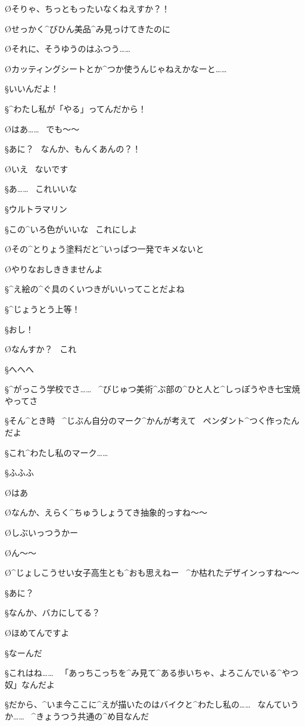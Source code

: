 \O そりゃ、ちっともったいなくねえすか？！

\O せっかく^{びひん}{美品}^{み}{見}っけてきたのに

\page
\O それに、そうゆうのはふつう……

\O カッティングシートとか^{つか}{使}うんじゃねえかなーと……

\S いいんだよ！

\S ^{わたし}{私}が「やる」ってんだから！

\O はあ……
\ でも〜〜

\S あに？
\ なんか、もんくあんの？！

\O いえ
\ ないです

\page
\S あ……
\ これいいな

\S ウルトラマリン

\S この^{いろ}{色}がいいな
\ これにしよ

\O その^{とりょう}{塗料}だと^{いっぱつ}{一発}でキメないと

\O やりなおしききませんよ

\S ^{え}{絵}の^{ぐ}{具}のくいつきがいいってことだよね

\S ^{じょうとう}{上等}！

\page
\S おし！

\O なんすか？
\ これ

\S へへへ

\S ^{がっこう}{学校}でさ……
\ ^{びじゅつ}{美術}^{ぶ}{部}の^{ひと}{人}と^{しっぽうやき}{七宝焼}やってさ

\S そん^{とき}{時}
\ ^{じぶん}{自分}のマーク^{かんが}{考}えて
\ ペンダント^{つく}{作}ったんだよ

\S これ^{わたし}{私}のマーク……

\S ふふふ

\O はあ

\page
\O なんか、えらく^{ちゅうしょうてき}{抽象的}っすね〜〜

\O しぶいっつうかー

\O ん〜〜

\O ^{じょしこうせい}{女子高生}とも^{おも}{思}えねー
\ ^{か}{枯}れたデザインっすね〜〜

\S あに？

\S なんか、バカにしてる？

\O ほめてんですよ

\S なーんだ

\page
\S これはね……
\ 「あっちこっちを^{み}{見}て^{ある}{歩}いちゃ、よろこんでいる^{やつ}{奴}」なんだよ

\S だから、^{いま}{今}ここに^{えが}{描}いたのはバイクと^{わたし}{私}の……
\ なんていうか……
\ ^{きょうつう}{共通}の^{め}{目}なんだ

